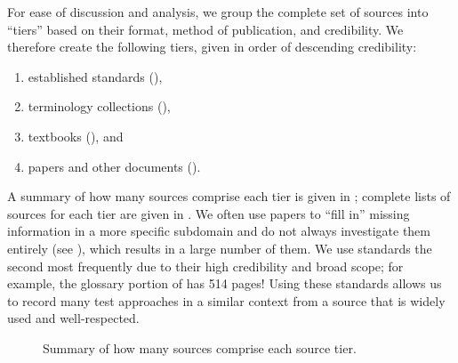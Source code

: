 For ease of discussion and analysis, we group the complete set of sources into
``tiers'' based on their format, method of publication, and credibility. We
therefore create the following tiers, given in order of descending credibility:
\begin{enumerate}
    \item established standards (),
    \item terminology collections (),
    \item textbooks (), and
    \item papers and other documents ().
\end{enumerate}
A summary of how many sources comprise each tier is given in
\ifnotpaper; complete lists of sources for each tier
are given in \fi. We often use papers to ``fill in'' missing
information in a more specific subdomain and do not always investigate them
entirely (see ), which results in a large number of them. We
use standards the second most frequently due to their high credibility and
broad scope; for example, the glossary portion of \citet{IEEE2017} has 514
pages! Using these standards allows us to record many test approaches in a
similar context from a source that is widely used and well-respected.

\begin{figure}[bt!]
    \centering
    \caption{Summary of how many sources comprise each source tier.}
    \label{fig:sourceSummary}
\end{figure}

\subsubsection{}\label{stds}


